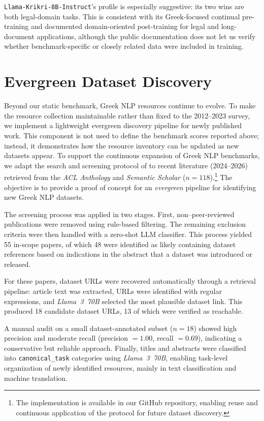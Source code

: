 \documentclass[sigconf,review,anonymous]{acmart}
\begin{document}
\texttt{Llama-Krikri-8B-Instruct}'s profile is especially suggestive: its two wins are both legal-domain tasks. This is consistent with its Greek-focused continual pre-training and documented domain-oriented post-training for legal and long-document applications, although the public documentation does not let us verify whether benchmark-specific or closely related data were included in training.

\section{Evergreen Dataset Discovery}

Beyond our static benchmark, Greek NLP resources continue to evolve. To make the resource collection maintainable rather than fixed to the 2012--2023 survey, we implement a lightweight evergreen discovery pipeline for newly published work. This component is not used to define the benchmark scores reported above; instead, it demonstrates how the resource inventory can be updated as new datasets appear.
To support the continuous expansion of Greek NLP benchmarks, we adapt the search and screening protocol of \citet{bakagianni2025systematic} to recent literature (2024--2026) retrieved from the \textit{ACL Anthology} and \textit{Semantic Scholar} (\(n=118\)).\footnote{The implementation is available in our GitHub repository, enabling reuse and continuous application of the protocol for future dataset discovery.} The objective is to provide a proof of concept for an \textit{evergreen} pipeline for identifying new Greek NLP datasets.

The screening process was applied in two stages. First, non--peer-reviewed publications were removed using rule-based filtering. The remaining exclusion criteria were then handled with a zero-shot LLM classifier. This process yielded 55 in-scope papers, of which 48 were identified as likely containing dataset references based on indications in the abstract that a dataset was introduced or released.

For these papers, dataset URLs were recovered automatically through a retrieval pipeline: article text was extracted, URLs were identified with regular expressions, and \textit{Llama~3~70B} selected the most plausible dataset link. This produced 18 candidate dataset URLs, 13 of which were verified as reachable.

A manual audit on a small dataset-annotated subset (\(n=18\)) showed high precision and moderate recall (precision \(=1.00\), recall \(=0.69\)), indicating a conservative but reliable approach. Finally, titles and abstracts were classified into \texttt{canonical\_task} categories using \textit{Llama~3~70B}, enabling task-level organization of newly identified resources, mainly in text classification and machine translation.
\end{document}
